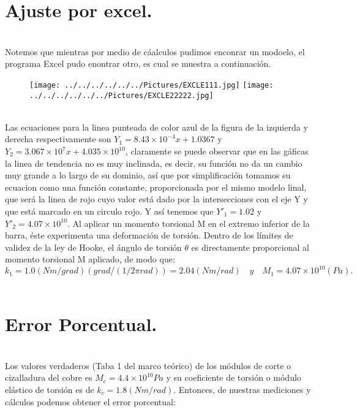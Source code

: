 \documentclass[10pt,a4paper]{article}
\begin{document}
\section*{Ajuste por excel.}\\
Notemos que mientras por medio de c\'{a}alculos pudimos enconrar un modoelo, el programa Excel pudo enontrar otro, es cual se muestra a continuaci\'{o}n.
\\
\begin{figure}[hbtp]
 \centering
\texttt{[image: ../../../../../../Pictures/EXCLE111.jpg]} 
\texttt{[image: ../../../../../../Pictures/EXCLE22222.jpg]}  
\end{figure}
\\
Las ecuaciones para la linea punteada de color azul de la figura de la izquierda y derecha respectivamente son ${ Y }_{ 1 }= { 8.43\times 10 }^{ -4 }x+ 1.0367$ y ${ Y }_{ 2 }= { 3.067\times 10 }^{ 7 }x+ { 4.035\times  10 }^{ 10 }$, claramente se puede observar que en las g\'{a}ficas la linea de tendencia no es muy inclinada, es decir, su funci\'{o}n no da un cambio muy grande a lo largo de su dominio, as\'{i} que por simplificaci\'{o}n tomamos su ecuacion como una funci\'{o}n constante, proporcionada por el mismo modelo linal, que ser\'{a} la linea de rojo cuyo valor est\'{a} dado por la intersecciones con el eje Y y que est\'{a} marcado en un circulo rojo. Y as\'{i} tenemos que ${ Y }'_{ 1 }= 1.02$ y ${ Y }'_{ 2 }=4.07\times { 10 }^{ 10 }$. Al aplicar un momento torsional M en el extremo inferior de la barra, \'{e}ste experimenta una deformaci\'{o}n de torsi\'{o}n. Dentro de los l\'{i}mites de validez de la ley de Hooke, el \'{a}ngulo de torsi\'{o}n $\theta$ es directamente proporcional al momento torsional M aplicado, de modo que:
\[{ k }_{ 1 }= 1.0(Nm/grad)\left( { grad }/{ \left( { 1 }/{ 2\pi rad } \right)  } \right)=2.04(Nm/rad)\quad y \quad { M }_{ 1 }=4.07\times { 10 }^{ 10 }(Pa).\]
\\
\section*{Error Porcentual.}\\
Los valores verdaderos (Taba 1 del marco te\'{o}rico) de los m\'{o}dulos de corte o cizalladura del cobre es ${ M }_{ c }=4.4\times { 10 }^{ 10 }Pa$ y su  coeficiente de torsi\'{o}n o m\'{o}dulo el\'{a}stico de torsi\'{o}n es de ${ k }_{ c }=1.8(Nm/rad)$. Entonces, de nuestras mediciones y c\'{a}lculos podemos obtener el error porcentual:
\end{document}
